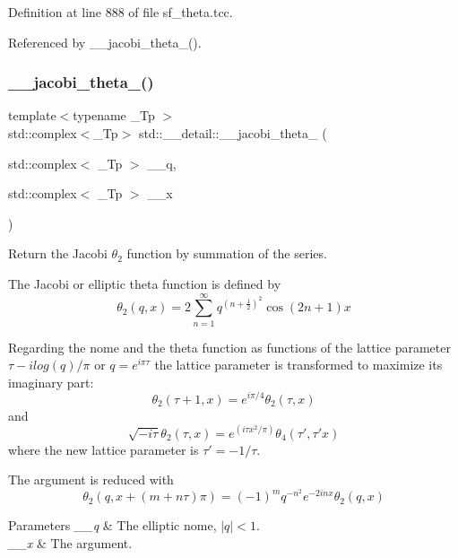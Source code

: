 Definition at line 888 of file sf\+\_\+theta.\+tcc.



Referenced by \+\_\+\+\_\+jacobi\+\_\+theta\+\_().

\mbox{\label{namespacestd_1_1____detail_aba908b579191a0c5f55be7db84ece5c5}} 
\subsubsection{\texorpdfstring{\+\_\+\+\_\+jacobi\+\_\+theta\+\_()}{\_\_jacobi\_theta\_2()}\hspace{0.1cm}{\footnotesize\ttfamily [1/2]}}
{\footnotesize\ttfamily template$<$typename \+\_\+\+Tp $>$ \\
std\+::complex$<$\+\_\+\+Tp$>$ std\+::\+\_\+\+\_\+detail\+::\+\_\+\+\_\+jacobi\+\_\+theta\+\_ (\begin{DoxyParamCaption}\item[{std\+::complex$<$ \+\_\+\+Tp $>$}]{\+\_\+\+\_\+q,  }\item[{std\+::complex$<$ \+\_\+\+Tp $>$}]{\+\_\+\+\_\+x }\end{DoxyParamCaption})}

Return the Jacobi $ \theta_2 $ function by summation of the series.

The Jacobi or elliptic theta function is defined by \[ \theta_2(q,x) = 2\sum_{n=1}^{\infty} q^{(n+\frac{1}{2})^2}\cos{(2n+1)x} \]

Regarding the nome and the theta function as functions of the lattice parameter $ \tau -i log(q)/ \pi $ or $ q = e^{i\pi\tau} $ the lattice parameter is transformed to maximize its imaginary part\+: \[ \theta_2(\tau+1,x) = e^{i\pi/4}\theta_2(\tau,x) \] and \[ \sqrt{-i\tau}\theta_2(\tau,x) = e^{(i\tau x^2/\pi)}\theta_4(\tau',\tau' x) \] where the new lattice parameter is $ \tau' = -1/\tau $.

The argument is reduced with \[ \theta_2(q, x + (m+n\tau)\pi) = (-1)^{m}q^{-n^2}e^{-2inx}\theta_2(q, x) \]


\begin{DoxyParams}{Parameters}
{\em \+\_\+\+\_\+q} & The elliptic nome, $ |q| < 1 $. \\
\hline
{\em \+\_\+\+\_\+x} & The argument. \\
\hline
\end{DoxyParams}


